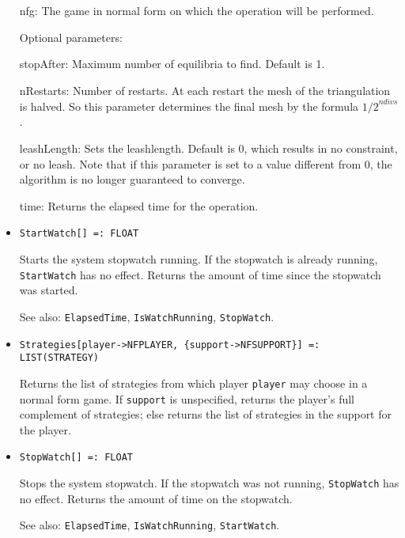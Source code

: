 \begin{itemize}
\bd
\item
[nfg:] The game in normal form on which the operation will be
performed.
\ed

\item
[Optional parameters:]\hfil\null
	
\bd
\item
[stopAfter:] Maximum number of equilibria to find. Default is 1.  
\item 
[nRestarts:] Number of restarts.  At each restart the mesh of the
triangulation is halved.  So this parameter determines the final mesh
by the formula ${1/2}^{ndivs}$.
\item
[leashLength:] Sets the leashlength. Default is 0, which results in no
constraint, or no leash.  Note that if this parameter is set to a value
different from 0, the algorithm is no longer guaranteed to converge.
\item
[time:] Returns the elapsed time for the operation.
\ed
\ed

\item
\protect \large \begin{verbatim}
StartWatch[] =: FLOAT
\end{verbatim}\normalsize

\bd
Starts the system stopwatch running.  If the stopwatch
is already running, {\tt StartWatch} has no effect.  Returns the amount
of time since the stopwatch was started.
\item
[See also:] {\tt ElapsedTime}, {\tt IsWatchRunning}, {\tt StopWatch}.
\ed

\item
\protect \large \begin{verbatim}
Strategies[player->NFPLAYER, {support->NFSUPPORT}] =: LIST(STRATEGY)
\end{verbatim}\normalsize

\bd
Returns the list of strategies from which player \verb+player+ may choose
in a normal form game.  If \verb+support+ is unspecified, returns the
player's full complement of strategies; else returns the list of strategies
in the support for the player.
\ed

\item
\protect \large \begin{verbatim}
StopWatch[] =: FLOAT
\end{verbatim}\normalsize

\bd
Stops the system stopwatch.  If the stopwatch was not
running, {\tt StopWatch} has no effect.  Returns the amount of time
on the stopwatch.
\item
[See also:] {\tt ElapsedTime}, {\tt IsWatchRunning}, {\tt StartWatch}.
\ed


\end{itemize}
